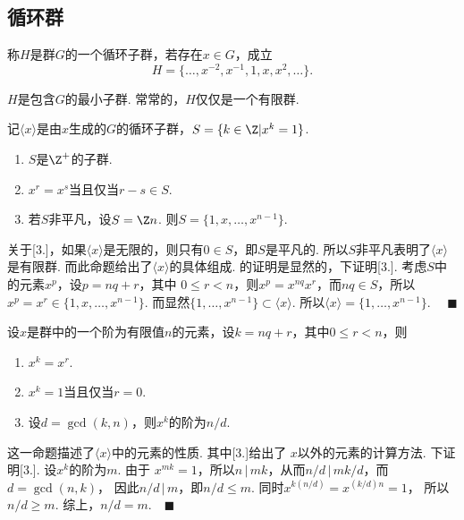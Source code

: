 \subsection{循环群}

  \begin{defi}[循环子群]
    称$H$是群$G$的一个循环子群，若存在$x\in G$，成立
    \[
      H = \{\dots, x^{-2}, x^{-1}, 1, x, x^2, \dots\}.
    \]
  \end{defi}
  \remark
    $H$是包含$G$的最小子群. 常常的，$H$仅仅是一个有限群.

  \begin{thm}
    记$\langle x \rangle$是由$x$生成的$G$的循环子群，$S=\{k\in\Z | x^k=1\}$.
    \begin{enumerate}
      \item $S$是$\Z^+$的子群.
      \item $x^r = x^s$当且仅当$r-s\in S$.
      \item 若$S$非平凡，设$S=\Z n$. 则$S=\{1, x,\dots,x^{n-1}\}$.
    \end{enumerate}
  \end{thm}
  \remark
    关于[3.]，如果$\langle x\rangle$是无限的，则只有$0\in S$，即$S$是平凡的.
    所以$S$非平凡表明了$\langle x \rangle$是有限群. 而此命题给出了$\langle
    x\rangle$的具体组成.
  \proof
    [1. 2.]的证明是显然的，下证明[3.]. 考虑$S$中的元素$x^p$，设$p=nq+r$，其中
    $0\le r < n$，则$x^p = x^{nq}x^r$，而$nq\in S$，所以$x^p=x^r\in
    \{1,x,\dots, x^{n-1}\}$. 而显然$\{1,\dots,x^{n-1}\}\subset\langle
    x\rangle$. 所以$\langle x\rangle = \{1,\dots,x^{n-1}\}$.
    $\quad\blacksquare$

  \begin{pos}
    \label{pos: 循环子群的性质}
    设$x$是群中的一个阶为有限值$n$的元素，设$k=nq+r$，其中$0\le r<n$，则
    \begin{enumerate}
      \item $x^k = x^r$.
      \item $x^k = 1$当且仅当$r=0$.
      \item 设$d=\gcd(k, n)$，则$x^k$的阶为$n/d$.
    \end{enumerate}
  \end{pos}
  \remark
    这一命题描述了$\langle x\rangle$中的元素的性质. 其中[3.]给出了
    $x$以外的元素的计算方法.
  \proof
    下证明[3.]. 设$x^k$的阶为$m$. 由于
    $x^{mk}=1$，所以$n\,|\,mk$，从而$n/d\,|\,mk/d$，而$d=\gcd(n, k)$，
    因此$n/d\,|\, m$，即$n/d \le m$. 同时$x^{k(n/d)} = x^{(k/d)n}=1$，
    所以$n/d \ge m$. 综上，$n/d = m$.$\quad\blacksquare$

